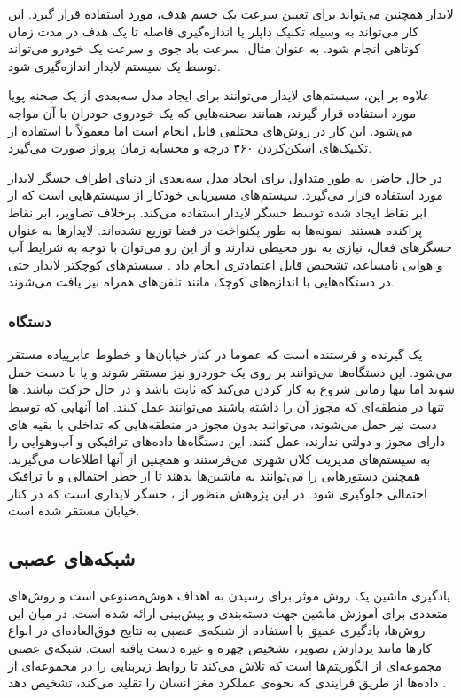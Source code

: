 لایدار همچنین می‌تواند برای تعیین سرعت یک جسم هدف، مورد استفاده قرار گیرد. این کار می‌تواند به وسیله تکنیک داپلر یا اندازه‌گیری فاصله تا یک هدف در مدت زمان کوتاهی انجام شود. به عنوان مثال، سرعت باد جوی و سرعت یک خودرو می‌تواند توسط یک سیستم لایدار اندازه‌گیری شود.

علاوه بر این، سیستم‌های لایدار می‌توانند برای ایجاد مدل سه‌بعدی از یک صحنه پویا مورد استفاده قرار گیرند، همانند صحنه‌هایی که یک خودروی خودران با آن مواجه می‌شود. این کار در روش‌های مختلفی قابل انجام است اما معمولاً با استفاده از تکنیک‌های اسکن‌کردن ۳۶۰ درجه و محسابه زمان پرواز صورت می‌گیرد.

در حال حاضر، به طور متداول برای ایجاد مدل سه‌بعدی از دنیای اطراف حسگر لایدار مورد استفاده قرار می‌گیرد. سیستم‌های مسیریابی خودکار از سیستم‌هایی است که از ابر نقاط ایجاد شده توسط حسگر لایدار استفاده می‌کند. برخلاف تصاویر، ابر نقاط پراکنده هستند: نمونه‌ها به طور یکنواخت در فضا توزیع نشده‌اند. لایدارها به عنوان حسگرهای فعال، نیازی به نور محیطی ندارند و از این رو می‌توان با توجه به شرایط آب و هوایی نامساعد، تشخیص قابل اعتمادتری انجام داد \cite{arnold2019survey}. سیستم‌های کوچکتر لایدار حتی در دستگاه‌هایی با اندازه‌های کوچک مانند تلفن‌های همراه نیز یافت می‌شوند.

\subsubsection{دستگاه }
یک گیرنده و فرستنده است که عموما در کنار خیابان‌ها و خطوط عابرپیاده مستقر می‌شود. این دستگاه‌ها می‌توانند بر روی یک خوردرو نیز مستقر شوند و یا با دست حمل شوند اما تنها زمانی شروع به کار کردن می‌کند که ثابت باشد و در حال حرکت نباشد. ها تنها در منطقه‌ای که مجوز آن‌ را داشته باشند می‌توانند عمل کنند. اما آنهایی که توسط دست نیز حمل می‌شوند، می‌توانند بدون مجوز در منطقه‌هایی که تداخلی با بقیه های دارای مجوز و دولتی ندارند، عمل کنند. این دستگاه‌ها داده‌‌های ترافیکی و آب‌وهوایی را به سیستم‌های مدیریت کلان شهری می‌فرستند و همچنین از آنها اطلاعات می‌گیرند. همچنین دستور‌هایی را می‌توانند به ماشین‌ها بدهند تا از خطر احتمالی و یا  ترافیک احتمالی جلوگیری شود. در این پژوهش منظور از ،  حسگر لایداری است که در کنار خیابان مستقر شده است.

\subsection{شبکه‌های عصبی}
یادگیری ماشین یک روش موثر برای رسیدن به اهداف هوش‌مصنوعی است و روش‌های متعددی برای آموزش ماشین جهت دسته‌بندی و پیش‌بینی ارائه شده است. در میان این روش‌ها، یادگیری عمیق با استفاده از شبکه‌ی عصبی به نتایج فوق‌العاده‌ای در انواع کارها مانند پردازش تصویر، تشخیص چهره و غیره دست‌ یافته است. شبکه‌ی عصبی مجموعه‌ای از الگوریتم‌ها است که تلاش می‌کند تا روابط زیربنایی را در مجموعه‌ای از داده‌ها از طریق فرایندی که نحوه‌ی عملکرد مغز انسان را تقلید می‌کند، تشخیص دهد \cite{zhou2019edge}. 

